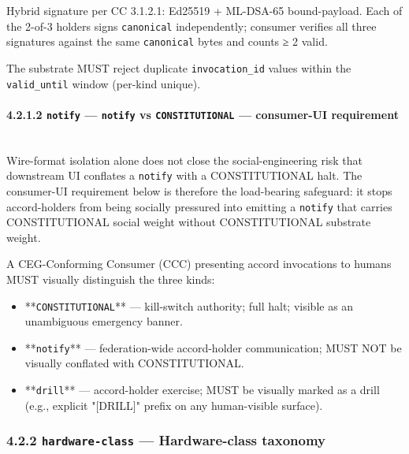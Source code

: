 \documentclass[11pt]{article}
\begin{document}
Hybrid signature per CC 3.1.2.1: Ed25519 + ML-DSA-65 bound-payload. Each of the 2-of-3 holders signs \texttt{canonical} independently; consumer verifies all three signatures against the same \texttt{canonical} bytes and counts ≥ 2 valid.


The substrate MUST reject duplicate \texttt{invocation\_id} values within the \texttt{valid\_until} window (per-kind unique).


\paragraph{4.2.1.2 \texttt{notify} — \texttt{notify} vs \texttt{CONSTITUTIONAL} — consumer-UI requirement}\mbox{}\\


Wire-format isolation alone does not close the social-engineering risk that downstream UI conflates a \texttt{notify} with a CONSTITUTIONAL halt. The consumer-UI requirement below is therefore the load-bearing safeguard: it stops accord-holders from being socially pressured into emitting a \texttt{notify} that carries CONSTITUTIONAL social weight without CONSTITUTIONAL substrate weight.


A CEG-Conforming Consumer (CCC) presenting accord invocations to humans MUST visually distinguish the three kinds:


\begin{itemize}\setlength\itemsep{0pt}
\item **\texttt{CONSTITUTIONAL}** — kill-switch authority; full halt; visible as an unambiguous emergency banner.
\item **\texttt{notify}** — federation-wide accord-holder communication; MUST NOT be visually conflated with CONSTITUTIONAL.
\item **\texttt{drill}** — accord-holder exercise; MUST be visually marked as a drill (e.g., explicit "[DRILL]" prefix on any human-visible surface).
\end{itemize}


\subsubsection*{4.2.2 \texttt{hardware-class} — Hardware-class taxonomy}
\end{document}
